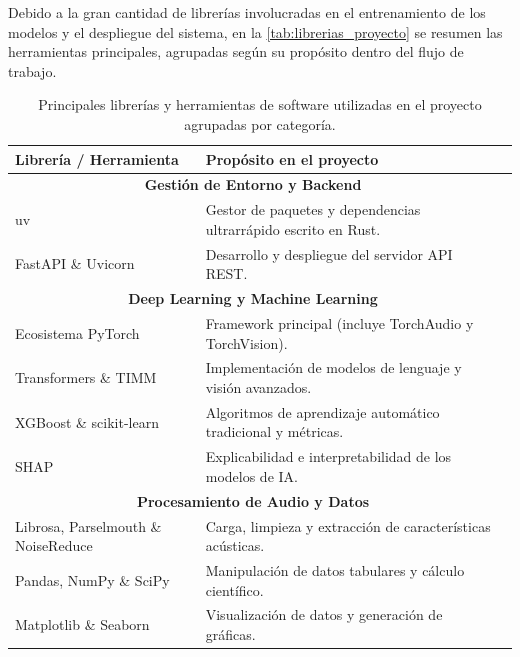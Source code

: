         Debido a la gran cantidad de librerías involucradas en el entrenamiento de los modelos y el despliegue del sistema, en la \autoref{tab:librerias_proyecto} se resumen las herramientas principales, agrupadas según su propósito dentro del flujo de trabajo.

        
        \begin{table}[htbp]
            \centering
            \begin{tabular}{@{}llp{8cm}@{}}
                \toprule
                \textbf{Librería / Herramienta} &  \textbf{Propósito en el proyecto} \\
                \midrule
                
                \multicolumn{2}{c}{\textbf{Gestión de Entorno y Backend}} \\
                \midrule
                uv & Gestor de paquetes y dependencias ultrarrápido escrito en Rust. \\
                FastAPI \& Uvicorn & Desarrollo y despliegue del servidor API REST. \\
                \midrule
                
                \multicolumn{2}{c}{\textbf{Deep Learning y Machine Learning}} \\
                \midrule
                Ecosistema PyTorch & Framework principal (incluye TorchAudio y TorchVision). \\
                Transformers \& TIMM & Implementación de modelos de lenguaje y visión avanzados. \\
                XGBoost \& scikit-learn & Algoritmos de aprendizaje automático tradicional y métricas. \\
                SHAP & Explicabilidad e interpretabilidad de los modelos de IA. \\
                \midrule
                
                \multicolumn{2}{c}{\textbf{Procesamiento de Audio y Datos}} \\
                \midrule
                Librosa, Parselmouth \& NoiseReduce & Carga, limpieza y extracción de características acústicas. \\
                Pandas, NumPy \& SciPy & Manipulación de datos tabulares y cálculo científico. \\
                Matplotlib \& Seaborn & Visualización de datos y generación de gráficas. \\
                \bottomrule
            \end{tabular}
            \caption{Principales librerías y herramientas de software utilizadas en el proyecto agrupadas por categoría.}
            \label{tab:librerias_proyecto}
        \end{table}

